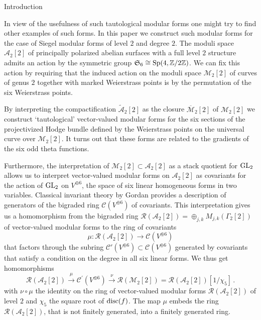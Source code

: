 \documentclass[12pt]{amsart}
\numberwithin{equation}{section}
\newcommand{\ZZ}{\mathbb Z}
\numberwithin{equation}{section}
\theoremstyle{definition}
\theoremstyle{remark}
\begin{document}
\begin{section}{Introduction}
\smallskip

In view of the usefulness of such tautological modular forms 
one might try to find other examples of such forms.
In this paper we construct such modular forms for the case of 
Siegel modular forms of level $2$ and degree $2$. 
The moduli space $\mathcal{A}_2[2]$ of principally polarized abelian surfaces with a
full level $2$ structure admits an action by the symmetric group $\mathfrak{S}_6\cong
{\rm Sp}(4,{\ZZ}/2{\ZZ})$. We can fix this action by requiring
 that the induced action on the moduli space $\mathcal{M}_2[2]$ 
of curves of genus $2$ together with marked Weierstrass points is by 
the permutation of the six Weierstrass points. 

\smallskip

By interpreting the compactification $\widetilde{\mathcal{A}}_2[2]$ as the closure $\overline{\mathcal{M}}_2[2]$ of $\mathcal{M}_2[2]$ we
construct `tautological' vector-valued modular forms for the six sections of the
projectivized Hodge bundle defined by the Weierstrass points
on the universal curve over $\mathcal{M}_2[2]$. It turns out that these forms are related to
the gradients of the six odd theta functions.

\smallskip
Furthermore, the interpretation of $\mathcal{M}_2[2] \subset \mathcal{A}_2[2]$ 
as a stack quotient for ${\rm GL}_2$ allows us to interpret vector-valued modular forms
on $\mathcal{A}_2[2]$ as covariants for the action of ${\rm GL}_2$ on $V^{\oplus 6}$, the space of
six linear homogeneous forms in two variables. Classical invariant theory by Gordan
provides a description of generators of the bigraded ring $\mathcal{C}(V^{\oplus 6})$ of covariants.
This interpretation gives us a homomorphism from the bigraded ring  $\mathcal{R}(\mathcal{A}_2[2]) 
=\oplus_{j,k} M_{j,k}(\Gamma_2[2])$ of vector-valued modular forms
to the ring of covariants
$$
\mu :\mathcal{R}(\mathcal{A}_2[2]) \longrightarrow \mathcal{C}(V^{\oplus 6})
$$
that factors through  the subring $\mathcal{C}'(V^{\oplus 6}) \subset \mathcal{C}(V^{\oplus 6})$ generated by covariants
that satisfy a condition on the degree in all six linear forms. We thus get homomorphisms
$$
\mathcal{R}(\mathcal{A}_2[2]) \xrightarrow{\mu} \mathcal{C}^{\prime}(V^{\oplus 6})\xrightarrow{\nu}
\mathcal{R}(\mathcal{M}_2[2])= \mathcal{R}(\mathcal{A}_2[2])[1/\chi_{5}] \, .
$$
with $\nu \circ \mu$ the identity on the ring of vector-valued modular forms $\mathcal{R}(\mathcal{A}_2[2])$ 
of level $2$ and $\chi_5$ the square root of ${\rm disc}(f)$. The map $\mu$ embeds the ring
$\mathcal{R}(\mathcal{A}_2[2])$, that is not finitely generated, into a finitely generated ring. 


\end{section}
\end{document}
